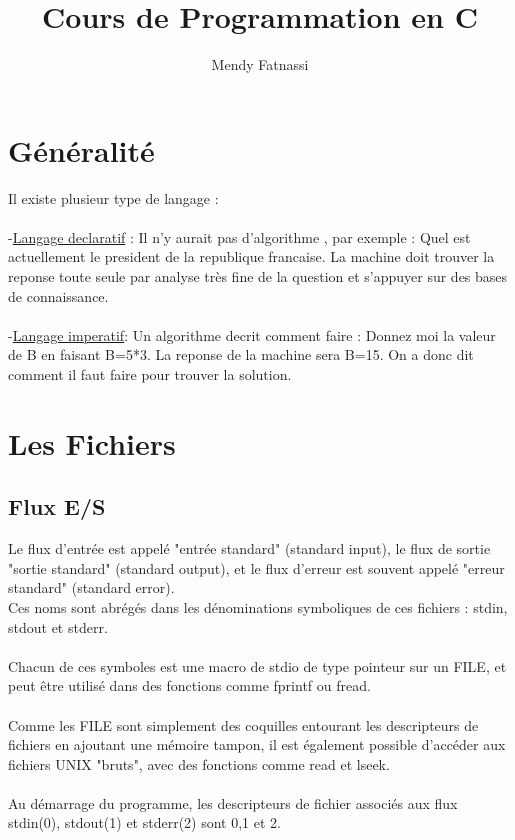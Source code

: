 \documentclass[a4paper,12pt,openany]{book}
\author{Mendy Fatnassi}
\title{Cours de Programmation en C}
\begin{document}
\maketitle
\tableofcontents

\chapter{Généralit\'e}

Il existe plusieur type de langage :\\
\\
-\underline{Langage declaratif} : Il n'y aurait pas d'algorithme , par exemple : Quel est actuellement le president de la republique francaise. La machine doit trouver la reponse toute seule par analyse tr\`es fine de la question et s'appuyer sur des bases de connaissance.\\
\\
-\underline{Langage imperatif}: Un algorithme decrit comment faire : Donnez moi la valeur de B en faisant B=5*3. La reponse de la machine sera B=15. On a donc dit comment il faut faire pour trouver la solution.\\



\chapter{Les Fichiers}

\section{Flux E/S}
Le flux d'entrée est appelé "entrée standard" (standard input), le flux de sortie "sortie standard" (standard output), et le flux d'erreur est souvent appelé "erreur standard" (standard error).\\ 
Ces noms sont abrégés dans les dénominations symboliques de ces fichiers : stdin, stdout et stderr.\\
\\
Chacun de ces symboles est une macro de stdio de type pointeur sur un FILE, et peut être utilisé dans des fonctions comme fprintf ou fread.\\
\\
Comme les FILE sont simplement des coquilles entourant les descripteurs de fichiers en ajoutant  une  mémoire  tampon,  il  est  également  possible  d'accéder aux fichiers UNIX "bruts", avec des fonctions comme read et lseek.\\
\\
Au démarrage du programme, les descripteurs de fichier associés aux flux stdin(0), stdout(1) et stderr(2) sont 0,1 et 2.\\
\end{document}
